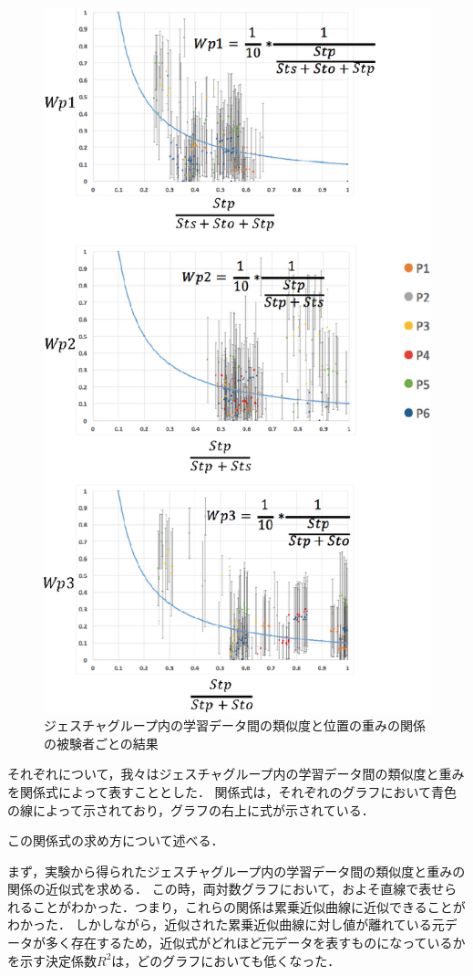 \begin{figure}[!h]
\centering
\includegraphics[width=0.7\columnwidth]{img/weight_position.eps}
\caption{ジェスチャグループ内の学習データ間の類似度と位置の重みの関係の被験者ごとの結果}
\label{fig:weight_position}
\end{figure}

それぞれについて，我々はジェスチャグループ内の学習データ間の類似度と重みを関係式によって表すこととした．
関係式は，それぞれのグラフにおいて青色の線によって示されており，グラフの右上に式が示されている．

この関係式の求め方について述べる．

まず，実験から得られたジェスチャグループ内の学習データ間の類似度と重みの関係の近似式を求める．
この時，両対数グラフにおいて，およそ直線で表せられることがわかった．つまり，これらの関係は累乗近似曲線に近似できることがわかった．
しかしながら，近似された累乗近似曲線に対し値が離れている元データが多く存在するため，近似式がどれほど元データを表すものになっているかを示す決定係数$R^2$は，どのグラフにおいても低くなった．

